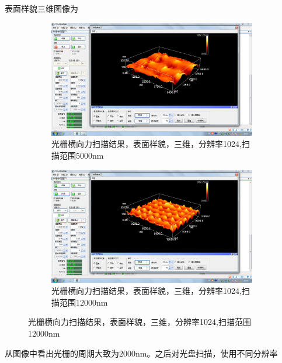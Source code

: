 \documentclass{ctexart}
\begin{document}
表面样貌三维图像为

\begin{figure}[H]
  \centering
  \begin{subfigure}{.49\textwidth}
    \centering
    \includegraphics[width=\linewidth]{AFM结果图像/光栅表面样貌三维_1024_5000nm}
    \caption{光栅横向力扫描结果，表面样貌，三维，分辨率1024,扫描范围5000nm}
  \end{subfigure}
  \begin{subfigure}{.49\textwidth}
    \centering
    \includegraphics[width=\linewidth]{AFM结果图像/光栅表面样貌三维_1024_12000nm}
    \caption{光栅横向力扫描结果，表面样貌，三维，分辨率1024,扫描范围12000nm}
  \end{subfigure}
\end{figure}

从图像中看出光栅的周期大致为2000nm。之后对光盘扫描，使用不同分辨率
\end{document}
